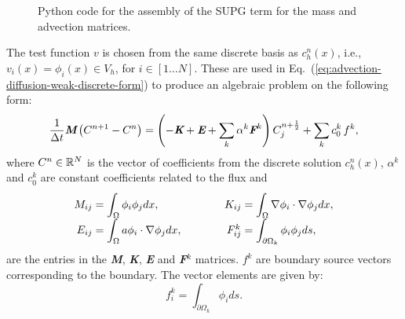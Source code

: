 \begin{figure}
  \centering
  \vspace{-1.5em}
  \caption{Python code for the assembly of the SUPG term for the mass and advection matrices.}
  \label{fig:SUPG-assembly-algorithm}
\end{figure}
The test function $v$ is chosen from the same discrete basis as $c^n_h(x)$, i.e., $v_i(x) = \phi_i(x)\in V_h$, for $i \in [1\ldots N]$. These are used in Eq.~(\ref{eq:advection-diffusion-weak-discrete-form}) to produce an algebraic problem on the following form:
\begin{equation}
  \label{eq:algebraic-equation}
  \frac{1}{\Delta{}t}\text{\bfseries\itshape M}\left(C^{n+1}-C^n\right) =  \left(-\text{\bfseries\itshape K}+\text{\bfseries\itshape E}+\sum_k\alpha^k\text{\bfseries\itshape F}^k\right)C_j^{n+\frac{1}{2}}+\sum_k c_0^k\,f^k,
\end{equation}
where $C^n\in \mathbb{R}^N$ is the vector of coefficients from the discrete solution $c^n_h(x)$, $\alpha^k$ and $c_0^k$ are constant coefficients related to the \kth flux and\\[-1.0em]
\begin{equation}
  \renewcommand{\arraystretch}{1.7}
  \renewcommand{\baselinestretch}{1.7}
  \begin{array}{r@{\;=\;}lcr@{\;=\;}l}
    M_{ij}&\displaystyle\int_\Omega\phi_i\phi_jdx,& \quad\quad&K_{ij}&\displaystyle\int_\Omega\nabla\phi_i\cdot\nabla\phi_jdx,\\
    E_{ij}&\displaystyle\int_\Omega a\phi_i\cdot\nabla\phi_jdx,& \quad\quad&F^k_{ij}&\displaystyle\int_{\partial\Omega_k}\phi_i\phi_jds,
  \end{array}
  \renewcommand{\arraystretch}{1}
  \renewcommand{\baselinestretch}{1}
  \label{eq:matrices}
\end{equation}
are the entries in the {\bfseries\itshape M}, {\bfseries\itshape K}, {\bfseries\itshape E} and {\bfseries\itshape F}$^k$ matrices. $f^k$ are boundary source vectors corresponding to the \kth boundary. The vector elements are given by:
\begin{equation}
  \label{eq:vector}
  f^k_{i}=\int_{\partial\Omega_k}\phi_ids.
\end{equation}

